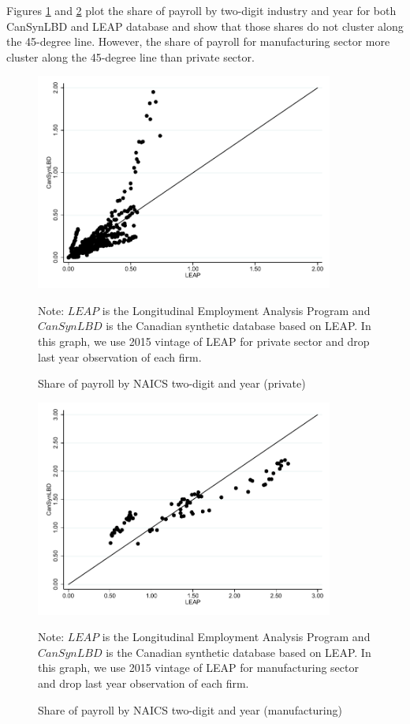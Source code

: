 \documentclass{article}
\begin{document}
Figures \ref{PayrollSharePrivate} and \ref{PayrollShareManufacturing} plot the share of payroll by two-digit industry and year for both CanSynLBD and LEAP database and show that those shares do not cluster along the 45-degree line. However, the share of payroll for manufacturing sector more cluster along the 45-degree line than private sector.
\begin{figure} [H]
\centering
\caption{Share of payroll by NAICS two-digit and year (private)} \label{PayrollSharePrivate}
\includegraphics[height=2.8in, width=.7\linewidth]{graphs/Share_of_payroll_by_NAICS_two-digit_and_year_private_bw.pdf} 
\begin{minipage}{0.85\textwidth}
{\footnotesize Note: $LEAP$ is the Longitudinal Employment Analysis Program and $CanSynLBD$ is the Canadian synthetic database based on LEAP. In this graph, we use 2015 vintage of LEAP for private sector and drop last year observation of each firm. \par}
\end{minipage}
\end{figure}
\vspace{-15.5pt}
\begin{figure} [H]
\centering
\caption{Share of payroll by NAICS two-digit and year (manufacturing)} \label{PayrollShareManufacturing}
\includegraphics[height=2.8in, width=.7\linewidth]{graphs/Share_of_payroll_by_NAICS_two-digit_and_year_Manufacturing_bw.pdf} 
\begin{minipage}{0.85\textwidth}
{\footnotesize Note: $LEAP$ is the Longitudinal Employment Analysis Program and $CanSynLBD$ is the Canadian synthetic database based on LEAP. In this graph, we use 2015 vintage of LEAP for manufacturing sector and drop last year observation of each firm. \par}
\end{minipage}
\end{figure}
\end{document}
